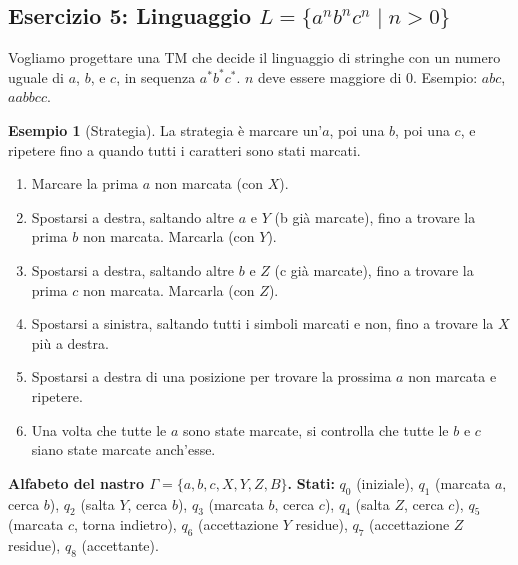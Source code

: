 \documentclass[a4paper]{article}
\theoremstyle{definition} %
\newtheorem{example}{Esempio}
\begin{document}
\subsection{Esercizio 5: Linguaggio $L = \{a^n b^n c^n \mid n > 0\}$}

Vogliamo progettare una TM che decide il linguaggio di stringhe con un numero uguale di $a$, $b$, e $c$, in sequenza $a^*b^*c^*$. $n$ deve essere maggiore di $0$. Esempio: $abc$, $aabbcc$.

\begin{example}[Strategia]
La strategia è marcare un'$a$, poi una $b$, poi una $c$, e ripetere fino a quando tutti i caratteri sono stati marcati.
\begin{enumerate}
    \item Marcare la prima $a$ non marcata (con $X$).
    \item Spostarsi a destra, saltando altre $a$ e $Y$ (b già marcate), fino a trovare la prima $b$ non marcata. Marcarla (con $Y$).
    \item Spostarsi a destra, saltando altre $b$ e $Z$ (c già marcate), fino a trovare la prima $c$ non marcata. Marcarla (con $Z$).
    \item Spostarsi a sinistra, saltando tutti i simboli marcati e non, fino a trovare la $X$ più a destra.
    \item Spostarsi a destra di una posizione per trovare la prossima $a$ non marcata e ripetere.
    \item Una volta che tutte le $a$ sono state marcate, si controlla che tutte le $b$ e $c$ siano state marcate anch'esse.
\end{enumerate}
\end{example}

\noindent \textbf{Alfabeto del nastro $\Gamma = \{a, b, c, X, Y, Z, B\}$.}
\noindent \textbf{Stati:} $q_0$ (iniziale), $q_1$ (marcata $a$, cerca $b$), $q_2$ (salta $Y$, cerca $b$), $q_3$ (marcata $b$, cerca $c$), $q_4$ (salta $Z$, cerca $c$), $q_5$ (marcata $c$, torna indietro), $q_6$ (accettazione $Y$ residue), $q_7$ (accettazione $Z$ residue), $q_8$ (accettante).
\end{document}
